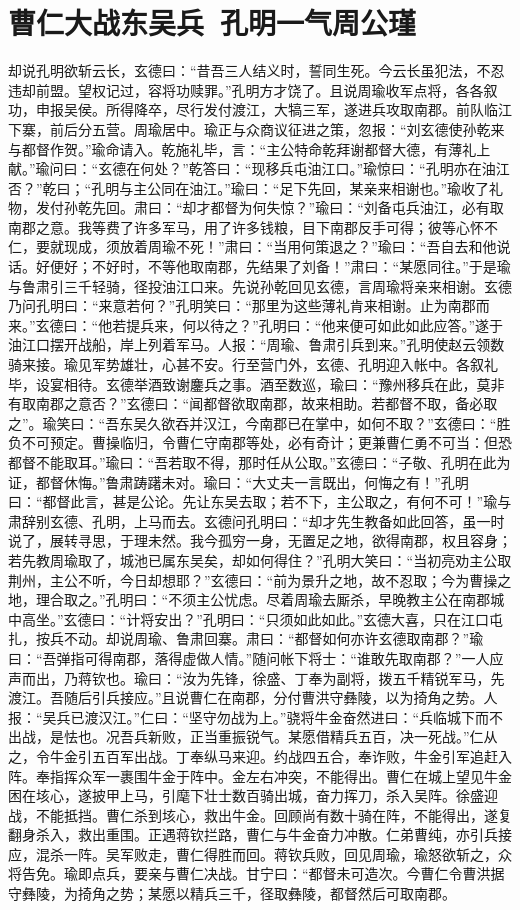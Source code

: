 \chapter{曹仁大战东吴兵~孔明一气周公瑾}

却说孔明欲斩云长，玄德曰：“昔吾三人结义时，誓同生死。今云长虽犯法，不忍违却前盟。望权记过，容将功赎罪。”孔明方才饶了。且说周瑜收军点将，各各叙功，申报吴侯。所得降卒，尽行发付渡江，大犒三军，遂进兵攻取南郡。前队临江下寨，前后分五营。周瑜居中。瑜正与众商议征进之策，忽报：“刘玄德使孙乾来与都督作贺。”瑜命请入。乾施礼毕，言：“主公特命乾拜谢都督大德，有薄礼上献。”瑜问曰：“玄德在何处？”乾答曰：“现移兵屯油江口。”瑜惊曰：“孔明亦在油江否？”乾曰；“孔明与主公同在油江。”瑜曰：“足下先回，某亲来相谢也。”瑜收了礼物，发付孙乾先回。肃曰：“却才都督为何失惊？”瑜曰：“刘备屯兵油江，必有取南郡之意。我等费了许多军马，用了许多钱粮，目下南郡反手可得；彼等心怀不仁，要就现成，须放着周瑜不死！”肃曰：“当用何策退之？”瑜曰：“吾自去和他说话。好便好；不好时，不等他取南郡，先结果了刘备！”肃曰：“某愿同往。”于是瑜与鲁肃引三千轻骑，径投油江口来。先说孙乾回见玄德，言周瑜将亲来相谢。玄德乃问孔明曰：“来意若何？”孔明笑曰：“那里为这些薄礼肯来相谢。止为南郡而来。”玄德曰：“他若提兵来，何以待之？”孔明曰：“他来便可如此如此应答。”遂于油江口摆开战船，岸上列着军马。人报：“周瑜、鲁肃引兵到来。”孔明使赵云领数骑来接。瑜见军势雄壮，心甚不安。行至营门外，玄德、孔明迎入帐中。各叙礼毕，设宴相待。玄德举酒致谢鏖兵之事。酒至数巡，瑜曰：“豫州移兵在此，莫非有取南郡之意否？”玄德曰：“闻都督欲取南郡，故来相助。若都督不取，备必取之”。瑜笑曰：“吾东吴久欲吞并汉江，今南郡已在掌中，如何不取？”玄德曰：“胜负不可预定。曹操临归，令曹仁守南郡等处，必有奇计；更兼曹仁勇不可当：但恐都督不能取耳。”瑜曰：“吾若取不得，那时任从公取。”玄德曰：“子敬、孔明在此为证，都督休悔。”鲁肃踌躇未对。瑜曰：“大丈夫一言既出，何悔之有！”孔明曰：“都督此言，甚是公论。先让东吴去取；若不下，主公取之，有何不可！”瑜与肃辞别玄德、孔明，上马而去。玄德问孔明曰：“却才先生教备如此回答，虽一时说了，展转寻思，于理未然。我今孤穷一身，无置足之地，欲得南郡，权且容身；若先教周瑜取了，城池已属东吴矣，却如何得住？”孔明大笑曰：“当初亮劝主公取荆州，主公不听，今日却想耶？”玄德曰：“前为景升之地，故不忍取；今为曹操之地，理合取之。”孔明曰：“不须主公忧虑。尽着周瑜去厮杀，早晚教主公在南郡城中高坐。”玄德曰：“计将安出？”孔明曰：“只须如此如此。”玄德大喜，只在江口屯扎，按兵不动。却说周瑜、鲁肃回寨。肃曰：“都督如何亦许玄德取南郡？”瑜曰：“吾弹指可得南郡，落得虚做人情。”随问帐下将士：“谁敢先取南郡？”一人应声而出，乃蒋钦也。瑜曰：“汝为先锋，徐盛、丁奉为副将，拨五千精锐军马，先渡江。吾随后引兵接应。”且说曹仁在南郡，分付曹洪守彝陵，以为掎角之势。人报：“吴兵已渡汉江。”仁曰：“坚守勿战为上。”骁将牛金奋然进曰：“兵临城下而不出战，是怯也。况吾兵新败，正当重振锐气。某愿借精兵五百，决一死战。”仁从之，令牛金引五百军出战。丁奉纵马来迎。约战四五合，奉诈败，牛金引军追赶入阵。奉指挥众军一裹围牛金于阵中。金左右冲突，不能得出。曹仁在城上望见牛金困在垓心，遂披甲上马，引麾下壮士数百骑出城，奋力挥刀，杀入吴阵。徐盛迎战，不能抵挡。曹仁杀到垓心，救出牛金。回顾尚有数十骑在阵，不能得出，遂复翻身杀入，救出重围。正遇蒋钦拦路，曹仁与牛金奋力冲散。仁弟曹纯，亦引兵接应，混杀一阵。吴军败走，曹仁得胜而回。蒋钦兵败，回见周瑜，瑜怒欲斩之，众将告免。瑜即点兵，要亲与曹仁决战。甘宁曰：“都督未可造次。今曹仁令曹洪据守彝陵，为掎角之势；某愿以精兵三千，径取彝陵，都督然后可取南郡。